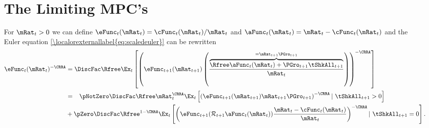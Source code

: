 \documentclass[\econtexRoot/BufferStockTheory]{subfiles}
\begin{document}
\hypertarget{The-Limiting-MPCs}{}
\section{The Limiting MPC's}
\label{sec:MPCLimits}
For $\mRat_{t}>0$ we can define $\eFunc_{t}(\mRat_{t})=\cFunc_{t}(\mRat_{t})/\mRat_{t}$
and $\aFunc_{t}(\mRat_{t})=\mRat_{t}-\cFunc_{t}(\mRat_{t})$
and the Euler equation \eqref{\localorexternallabel{eq:scaledeuler}} can be rewritten
\begin{align}
 \eFunc_{t}(\mRat_{t})^{-\CRRA}  & = \DiscFac \Rfree \Ex_{t}\left[\left(\eFunc_{t+1}({\mRat}_{t+1})\left(\frac{\overbrace{\Rfree \aFunc_{t}(\mRat_{t})+{\PGro}_{t+1}{\tShkAll}_{t+1}}^{=\mRat_{t+1}\PGro_{t+1}}}{\mRat_{t}}\right)\right)^{-\CRRA }\right] \label{eq:eFuncEuler}
\\  & = \phantom{ + }\pNotZero \DiscFac \Rfree \mRat_{t}^{\CRRA} \Ex_{t}\left[ \left(\eFunc_{t+1}(\mRat_{t+1}) \mRat_{t+1}\PGro_{t+1}\right)^{-\CRRA} |~ \tShkAll_{t+1}>0 \right] \notag
\\ &  + \pZero  \DiscFac \Rfree^{1-\CRRA} \Ex_{t}\left[\left(\eFunc_{t+1}(\mathcal{R}_{t+1}\aFunc_{t}(\mRat_{t}))\frac{\mRat_t-\cFunc_{t}(\mRat_{t})}{\mRat_{t}}\right)^{-\CRRA} |~ \tShkAll_{t+1} = 0 \right]   .
\end{align}
\end{document}
